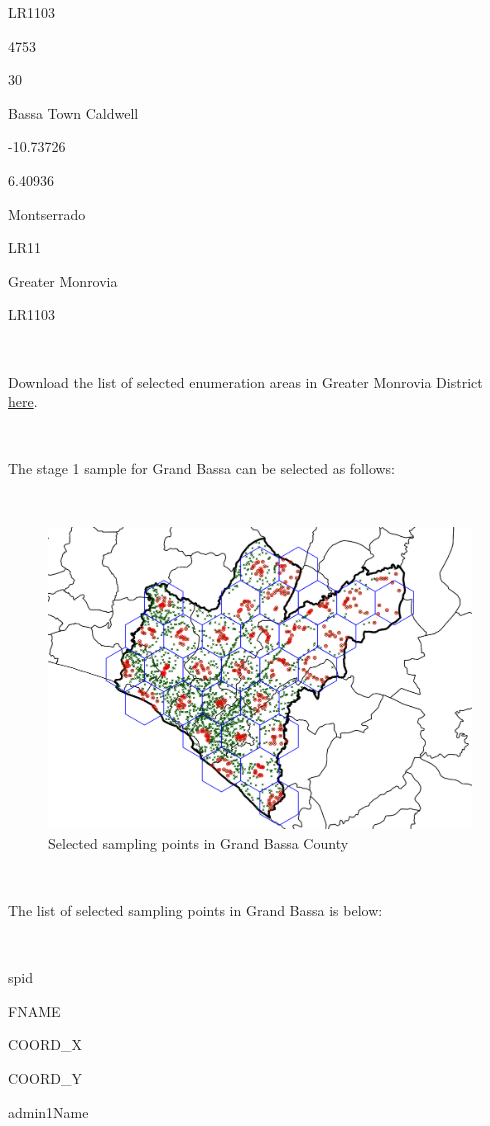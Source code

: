 \documentclass[12pt,a4paper]{book}
\theoremstyle{definition}
\theoremstyle{definition}
\theoremstyle{definition}
\theoremstyle{remark}
\let\BeginKnitrBlock\begin \let\EndKnitrBlock\end
\begin{document}
LR1103

4753

30

Bassa Town Caldwell

-10.73726

6.40936

Montserrado

LR11

Greater Monrovia

LR1103

~

\BeginKnitrBlock{rmddownload}
Download the list of selected enumeration areas in Greater Monrovia
District \href{data/greaterMonroviaSPlist.csv}{here}.
\EndKnitrBlock{rmddownload}

~

The stage 1 sample for Grand Bassa can be selected as follows:

~

\begin{figure}[H]

\includegraphics{figures/sample25-1} \hfill{}

\caption{Selected sampling points in Grand Bassa County}\label{fig:sample25}
\end{figure}

~

The list of selected sampling points in Grand Bassa is below:

~

spid

FNAME

COORD\_X

COORD\_Y

admin1Name
\end{document}
